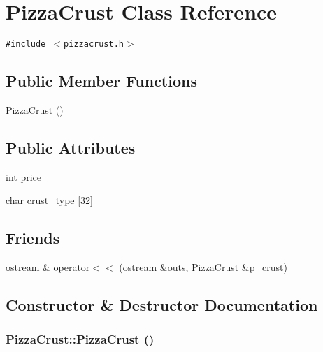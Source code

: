 \hypertarget{class_pizza_crust}{
\section{Pizza\-Crust Class Reference}
\label{class_pizza_crust}
}
{\tt \#include $<$pizzacrust.h$>$}

\subsection*{Public Member Functions}
\begin{CompactItemize}
\item 
\hyperlink{class_pizza_crust_931742b963a7890dfdd6c5b2c92fcbae}{Pizza\-Crust} ()
\end{CompactItemize}
\subsection*{Public Attributes}
\begin{CompactItemize}
\item 
int \hyperlink{class_pizza_crust_78a5eb43deef9a7b5b9ce157b9d52ac4}{price}
\item 
char \hyperlink{class_pizza_crust_91fd485033455873cfc268875c70012f}{crust\_\-type} \mbox{[}32\mbox{]}
\end{CompactItemize}
\subsection*{Friends}
\begin{CompactItemize}
\item 
ostream \& \hyperlink{class_pizza_crust_07175b634a5d3de09efbf91a6a782d36}{operator$<$$<$} (ostream \&outs, \hyperlink{class_pizza_crust}{Pizza\-Crust} \&p\_\-crust)
\end{CompactItemize}


\subsection{Constructor \& Destructor Documentation}
\hypertarget{class_pizza_crust_931742b963a7890dfdd6c5b2c92fcbae}{
\subsubsection[PizzaCrust]{\setlength{\rightskip}{0pt plus 5cm}Pizza\-Crust::Pizza\-Crust ()}}
\label{class_pizza_crust_931742b963a7890dfdd6c5b2c92fcbae}




